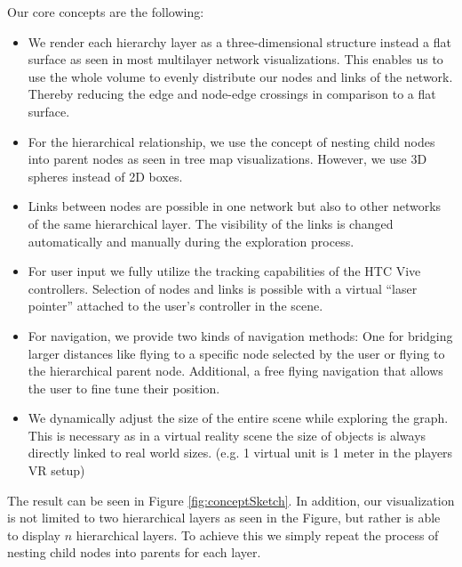 Our core concepts are the following: 
\begin{itemize}
    \item We render each hierarchy layer as a three-dimensional structure instead a flat surface as seen in most multilayer network visualizations. This enables us to use the whole volume to evenly distribute our nodes and links of the network. Thereby reducing the edge and node-edge crossings in comparison to a flat surface.   
    \item For the hierarchical relationship, we use the concept of nesting child nodes into parent nodes as seen in tree map visualizations. However, we use 3D spheres instead of 2D boxes. 
    \item Links between nodes are possible in one network but also to other networks of the same hierarchical layer. The visibility of the links is changed automatically and manually during the exploration process. 
    \item For user input we fully utilize the tracking capabilities of the HTC Vive controllers. Selection of nodes and links is possible with a virtual “laser pointer” attached to the user's controller in the scene.
    \item For navigation, we provide two kinds of navigation methods: One for bridging larger distances like flying to a specific node selected by the user or flying to the hierarchical parent node. Additional, a free flying navigation that allows the user to fine tune their position.
    \item We dynamically adjust the size of the entire scene while exploring the graph. This is necessary as in a virtual reality scene the size of objects is always directly linked to real world sizes. (e.g. 1 virtual unit is 1 meter in the players VR setup)
\end{itemize}
The result can be seen in Figure \ref{fig:conceptSketch}.
In addition, our visualization is not limited to two hierarchical layers as seen in the Figure, but rather is able to display $n$ hierarchical layers. To achieve this we simply repeat the process of nesting child nodes into parents for each layer.

